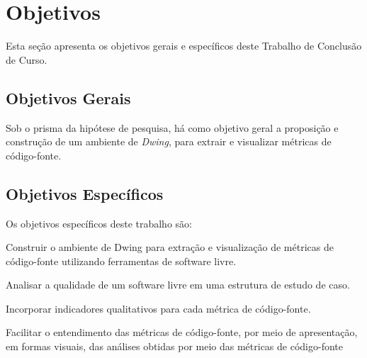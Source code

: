 





\section{Objetivos}

Esta seção apresenta os objetivos gerais e específicos deste Trabalho de 
Conclusão de Curso.

\subsection{Objetivos Gerais}
Sob o prisma da hipótese de pesquisa, há como objetivo geral a proposição e 
construção  de um ambiente de \textit{Dwing}, para extrair e visualizar 
métricas de código-fonte.



\subsection{Objetivos Específicos}

Os objetivos específicos deste trabalho são:


\begin{objectives}
	\item Construir o ambiente de Dwing para extração e visualização de 
	métricas de código-fonte utilizando ferramentas de software livre. 

	\item Analisar a qualidade de um software livre em uma estrutura de estudo
	de caso.
  
	\item Incorporar indicadores qualitativos para cada métrica de código-fonte.
	
	\item Facilitar o entendimento das métricas de código-fonte, por meio de 
	apresentação, em formas visuais, das análises obtidas por meio das métricas de código-fonte
	
    \end{objectives}
	


